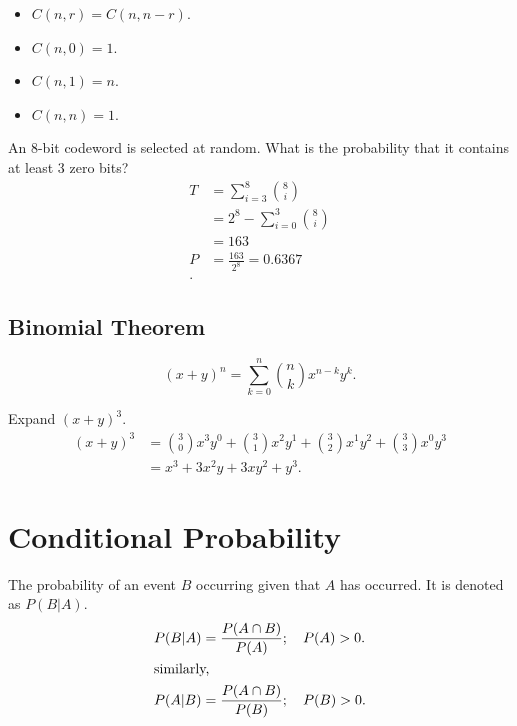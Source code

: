 \documentclass{article}
\begin{document}
\begin{remark}
    \begin{itemize}
        \item $C(n, r) = C(n, n-r)$.
        \item $C(n, 0) = 1$.
        \item $C(n, 1) = n$.
        \item $C(n, n) = 1$.
    \end{itemize}
\end{remark}

\begin{example}
    An 8-bit codeword is selected at random. What is the probability that it contains at least 3 zero bits?
    \begin{align*}
        T &= \sum^{8}_{i=3} \binom{8}{i} \\
          &= 2^{8}-\sum^{3}_{i=0} \binom{8}{i} \\
          &= 163 \\
        P &= \frac{163}{2^{8} }=0.6367 \\
    .\end{align*}
\end{example}

\subsection{Binomial Theorem}

\begin{definition}
    \[
        (x+y)^{n}=\sum^{n}_{k=0} \binom{n}{k}x^{n-k}y^{k}
    .\]
\end{definition}

\begin{example}
    Expand $(x+y)^{3}$.
    \begin{align*}
        (x+y)^{3} &= \binom{3}{0}x^{3}y^{0}+\binom{3}{1}x^{2}y^{1}+\binom{3}{2}x^{1}y^{2}+\binom{3}{3}x^{0}y^{3} \\
                  &= x^{3}+3x^{2}y+3xy^{2}+y^{3}.
    \end{align*}
\end{example}

\section{Conditional Probability}

\begin{definition}
The probability of an event \( B \) occurring given that \( A \) has occurred. It is denoted as \( P(B|A) \).
\begin{align}
    P(B|A) &= \frac{P(A \cap B)}{P(A)}; \quad P(A) > 0. \label{eq:conditional} \\
    \intertext{similarly,}
    P(A|B) &= \frac{P(A \cap B)}{P(B)}; \quad P(B) > 0. \nonumber
\end{align}
\label{def:conditional_probability}
\end{definition}
\end{document}
